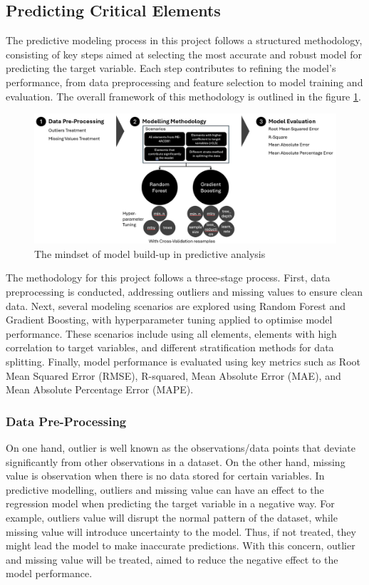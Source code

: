 \documentclass[11pt,a4paper,]{article}
\begin{document}
\subsection{Predicting Critical Elements}\label{predicting-critical-elements}

The predictive modeling process in this project follows a structured methodology, consisting of key steps aimed at selecting the most accurate and robust model for predicting the target variable. Each step contributes to refining the model's performance, from data preprocessing and feature selection to model training and evaluation. The overall framework of this methodology is outlined in the figure \ref{fig:modelbuilding}.

\begin{figure}
\centering
\includegraphics{Final_report_files/figure-latex/Methodology.png}
\caption{\label{fig:modelbuilding}The mindset of model build-up in predictive analysis}
\end{figure}

The methodology for this project follows a three-stage process. First, data preprocessing is conducted, addressing outliers and missing values to ensure clean data. Next, several modeling scenarios are explored using Random Forest and Gradient Boosting, with hyperparameter tuning applied to optimise model performance. These scenarios include using all elements, elements with high correlation to target variables, and different stratification methods for data splitting. Finally, model performance is evaluated using key metrics such as Root Mean Squared Error (RMSE), R-squared, Mean Absolute Error (MAE), and Mean Absolute Percentage Error (MAPE).

\subsubsection{Data Pre-Processing}\label{data-pre-processing}

On one hand, outlier is well known as the observations/data points that deviate significantly from other observations in a dataset. On the other hand, missing value is observation when there is no data stored for certain variables. In predictive modelling, outliers and missing value can have an effect to the regression model when predicting the target variable in a negative way. For example, outliers value will disrupt the normal pattern of the dataset, while missing value will introduce uncertainty to the model. Thus, if not treated, they might lead the model to make inaccurate predictions. With this concern, outlier and missing value will be treated, aimed to reduce the negative effect to the model performance.
\end{document}
